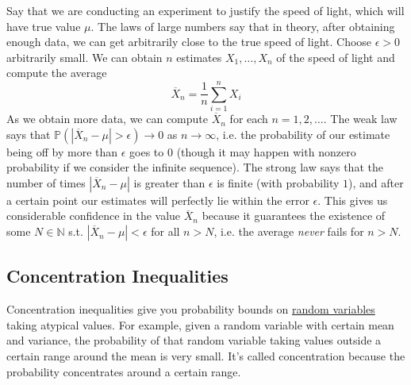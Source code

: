   \begin{example}
    \label{ex:estimating-speed-of-light}
    Say that we are conducting an experiment to justify the speed of light, which will have true value $\mu$. The laws of large numbers say that in theory, after obtaining enough data, we can get arbitrarily close to the true speed of light. Choose $\epsilon > 0$ arbitrarily small. We can obtain $n$ estimates $X_1, \ldots, X_n$ of the speed of light and compute the average 
    \begin{equation}
      \overline{X}_n = \frac{1}{n} \sum_{i=1}^n X_i
    \end{equation}
    As we obtain more data, we can compute $\overline{X}_n$ for each $n = 1, 2, \ldots$. The weak law says that $\mathbb{P}(|\overline{X}_n - \mu| > \epsilon) \rightarrow 0$ as $n \rightarrow \infty$, i.e. the probability of our estimate being off by more than $\epsilon$ goes to $0$ (though it may happen with nonzero probability if we consider the infinite sequence). The strong law says that the number of times $|\overline{X}_n - \mu|$ is greater than $\epsilon$ is finite (with probability $1$), and after a certain point our estimates will perfectly lie within the error $\epsilon$. This gives us considerable confidence in the value $\overline{X}_n$ because it guarantees the existence of some $N \in \mathbb{N}$ s.t. $|\overline{X}_n - \mu| < \epsilon$ for all $n > N$, i.e. the average \textit{never} fails for $n > N$. 
  \end{example}

\subsection{Concentration Inequalities}

  Concentration inequalities give you probability bounds on \hyperref[def:random-variable]{random variables} taking atypical values. For example, given a random variable with certain mean and variance, the probability of that random variable taking values outside a certain range around the mean is very small. It's called concentration because the probability concentrates around a certain range. 

